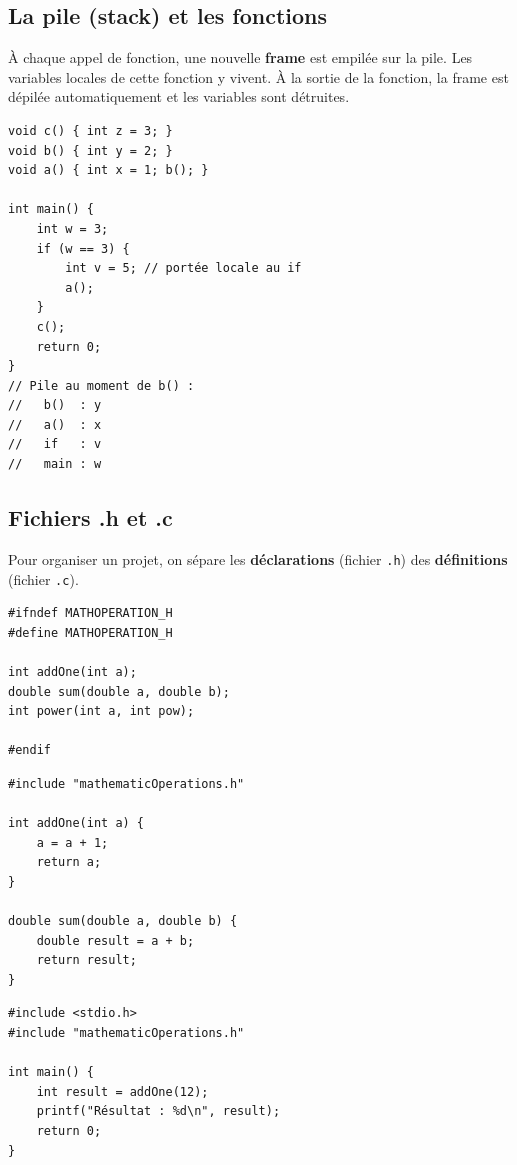 \documentclass[12pt,a4paper]{article}
\begin{document}
\subsection{La pile (stack) et les fonctions}

À chaque appel de fonction, une nouvelle \textbf{frame} est empilée sur la pile. Les variables locales de cette fonction y vivent. À la sortie de la fonction, la frame est dépilée automatiquement et les variables sont détruites.

\begin{lstlisting}[caption={Pile d'exécution}]
void c() { int z = 3; }
void b() { int y = 2; }
void a() { int x = 1; b(); }

int main() {
    int w = 3;
    if (w == 3) {
        int v = 5; // portée locale au if
        a();
    }
    c();
    return 0;
}
// Pile au moment de b() :
//   b()  : y
//   a()  : x
//   if   : v
//   main : w
\end{lstlisting}

\subsection{Fichiers .h et .c}

Pour organiser un projet, on sépare les \textbf{déclarations} (fichier \texttt{.h}) des \textbf{définitions} (fichier \texttt{.c}).

\begin{lstlisting}[caption={mathematicOperations.h}]
#ifndef MATHOPERATION_H
#define MATHOPERATION_H

int addOne(int a);
double sum(double a, double b);
int power(int a, int pow);

#endif
\end{lstlisting}

\begin{lstlisting}[caption={mathematicOperations.c}]
#include "mathematicOperations.h"

int addOne(int a) {
    a = a + 1;
    return a;
}

double sum(double a, double b) {
    double result = a + b;
    return result;
}
\end{lstlisting}

\begin{lstlisting}[caption={main.c}]
#include <stdio.h>
#include "mathematicOperations.h"

int main() {
    int result = addOne(12);
    printf("Résultat : %d\n", result);
    return 0;
}
\end{lstlisting}
\end{document}
